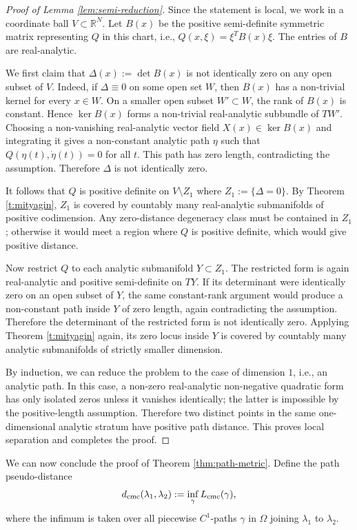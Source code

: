 \documentclass[11pt]{amsart}
\theoremstyle{plain}
\theoremstyle{definition}
\theoremstyle{remark}
\begin{document}
\begin{proof}[Proof of Lemma \ref{lem:semi-reduction}]
Since the statement is local, we work in a coordinate ball
$V\subset\mathbb R^N$.
Let $B(x)$ be the positive semi-definite symmetric matrix representing $Q$
in this chart, i.e.,
$Q(x,\xi)=\xi^T B(x)\xi$.
The entries of $B$ are real-analytic.

We first claim that
$\Delta(x):=\det B(x)$
is not identically zero on any open subset of $V$. Indeed, if
$\Delta\equiv0$ on some open set $W$, then $B(x)$ has a non-trivial kernel
for every $x\in W$. On a smaller open subset $W'\subset W$, the rank of
$B(x)$ is constant. Hence $\ker B(x)$ forms a non-trivial real-analytic
subbundle of $TW'$. Choosing a non-vanishing real-analytic vector field
$X(x)\in\ker B(x)$ and integrating it gives a non-constant analytic path
$\eta$ such that
$Q(\eta(t),\dot\eta(t))=0$
for all $t$. This path has zero length, contradicting the assumption.
Therefore $\Delta$ is not identically zero.

It follows that $Q$ is positive definite on
$V\setminus Z_1$ where $Z_1:=\{\Delta=0\}$.
By Theorem
\ref{t:mityagin}, $Z_1$ is covered by countably many real-analytic
submanifolds of positive codimension. Any zero-distance degeneracy class must
be contained in $Z_1$; otherwise it would meet a region where $Q$ is
positive definite, which 
would give positive
distance.

Now restrict $Q$ to each analytic submanifold $Y\subset Z_1$. The restricted
form is again real-analytic and positive semi-definite on $TY$. If its
determinant were identically zero on an open subset of $Y$, the same
constant-rank argument would produce a non-constant path inside $Y$ of zero
length, again contradicting the assumption. Therefore the determinant of the
restricted form is not identically zero. Applying 
Theorem  \ref{t:mityagin} again, 
its
zero locus inside $Y$ is covered by countably many analytic submanifolds of
strictly smaller dimension.

By induction, we can reduce 
the problem to the case of dimension $1$, i.e., an analytic path.
In this case,
a non-zero real-analytic
non-negative quadratic form has only isolated zeros unless it vanishes
identically; the latter is impossible by the positive-length assumption.
Therefore two distinct points in the same one-dimensional analytic stratum have
positive path distance. This
proves local separation and completes the proof.
\end{proof}

We can now conclude the 
proof of Theorem \ref{thm:path-metric}.
Define the path pseudo-distance
$$
d_{\rm cmc}(\lambda_1,\lambda_2):=
\inf_\gamma L_{\rm cmc}(\gamma),
$$
where the infimum is taken over all piecewise $C^1$-paths
$\gamma$ in $\Omega$ joining $\lambda_1$ to $\lambda_2$.
\end{document}
